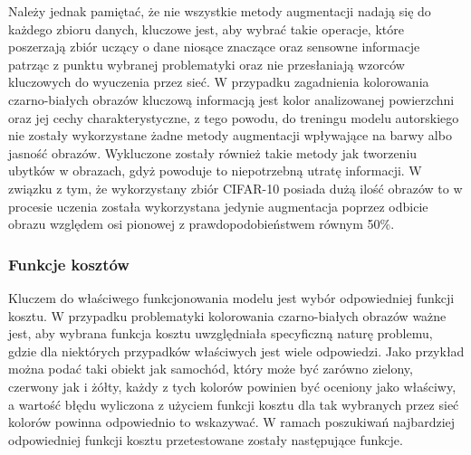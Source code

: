   Należy jednak pamiętać, że nie wszystkie metody augmentacji nadają się do każdego zbioru
  danych, kluczowe jest, aby wybrać takie operacje, które poszerzają zbiór
  uczący o dane niosące znaczące oraz sensowne informacje patrząc z punktu wybranej
  problematyki oraz nie przesłaniają wzorców kluczowych do wyuczenia przez sieć.
  W przypadku zagadnienia kolorowania czarno-białych obrazów kluczową informacją
  jest kolor analizowanej powierzchni oraz jej cechy charakterystyczne, z tego
  powodu, do treningu modelu autorskiego nie zostały wykorzystane żadne metody
  augmentacji wpływające na barwy albo jasność obrazów. Wykluczone zostały również takie
  metody jak tworzeniu ubytków w obrazach, gdyż powoduje to niepotrzebną utratę
  informacji.
  W związku z tym, że wykorzystany zbiór CIFAR-10 posiada dużą ilość obrazów
  to w procesie uczenia została wykorzystana jedynie augmentacja poprzez
  odbicie obrazu względem osi pionowej z prawdopodobieństwem równym 50\%.


\subsubsection{Funkcje kosztów} \label{Funkcje kosztów}
  Kluczem do właściwego funkcjonowania modelu jest wybór odpowiedniej funkcji
  kosztu. W przypadku problematyki kolorowania czarno-białych obrazów ważne
  jest, aby wybrana funkcja kosztu uwzględniała specyficzną naturę problemu,
  gdzie dla niektórych przypadków właściwych jest wiele odpowiedzi. Jako
  przykład można podać taki obiekt jak samochód, który może być zarówno
  zielony, czerwony jak i żółty, każdy z tych kolorów powinien być oceniony
  jako właściwy, a wartość błędu wyliczona z użyciem funkcji kosztu dla tak
  wybranych przez sieć kolorów powinna odpowiednio to wskazywać. W ramach
  poszukiwań najbardziej odpowiedniej funkcji kosztu przetestowane zostały
  następujące funkcje.

